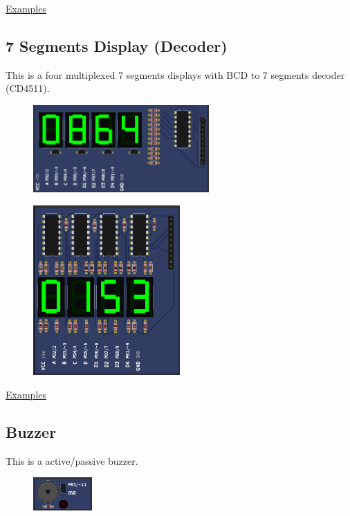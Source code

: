 \href{https://lcgamboa.github.io/picsimlab_examples/examples/examples_index.html\#7\_Segments\_Display}{Examples}

\subsection{7 Segments Display (Decoder)}

This is a four multiplexed 7 segments displays with BCD to 7 segments decoder (CD4511).

\begin{figure}[H]
\center
\includegraphics[width=0.6\textwidth]{img/part_7seg_dec.png} 
\end{figure} 

\begin{figure}[H]
\center
\includegraphics[width=0.5\textwidth]{img/part_7seg_latch.png} 
\end{figure} 

\href{https://lcgamboa.github.io/picsimlab_examples/examples/examples_index.html\#7\_Segments\_Display\_(w/dec)}{Examples}

\subsection{Buzzer}

This is a active/passive buzzer.

\begin{figure}[H]
\center
\includegraphics[width=0.2\textwidth]{img/part_buzzer.png} 
\end{figure} 

